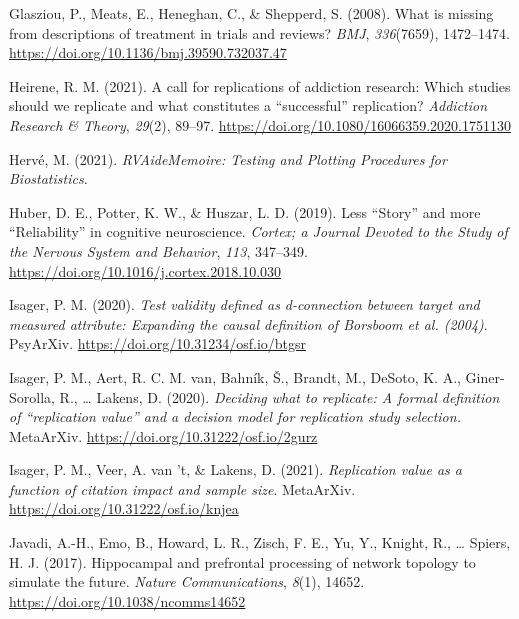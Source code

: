 \documentclass[
  man,floatsintext]{apa6}
\newlength{\cslhangindent}
\newlength{\cslentryspacingunit} %
\newenvironment{CSLReferences}[2] %
 {%
  \setlength{\parindent}{0pt}
  \ifodd #1
  \let\oldpar\par
  \def\par{\hangindent=\cslhangindent\oldpar}
  \fi
  \setlength{\parskip}{#2\cslentryspacingunit}
 }%
 {}
\begin{document}
\begin{CSLReferences}{1}{0}
\leavevmode{}%
Glasziou, P., Meats, E., Heneghan, C., \& Shepperd, S. (2008). What is missing from descriptions of treatment in trials and reviews? \emph{BMJ}, \emph{336}(7659), 1472--1474. \url{https://doi.org/10.1136/bmj.39590.732037.47}

\leavevmode{}%
Heirene, R. M. (2021). A call for replications of addiction research: Which studies should we replicate and what constitutes a {``successful''} replication? \emph{Addiction Research \& Theory}, \emph{29}(2), 89--97. \url{https://doi.org/10.1080/16066359.2020.1751130}

\leavevmode{}%
Hervé, M. (2021). \emph{{RVAideMemoire}: {Testing} and {Plotting Procedures} for {Biostatistics}}.

\leavevmode{}%
Huber, D. E., Potter, K. W., \& Huszar, L. D. (2019). Less {``{Story}''} and more {``{Reliability}''} in cognitive neuroscience. \emph{Cortex; a Journal Devoted to the Study of the Nervous System and Behavior}, \emph{113}, 347--349. \url{https://doi.org/10.1016/j.cortex.2018.10.030}

\leavevmode{}%
Isager, P. M. (2020). \emph{Test validity defined as d-connection between target and measured attribute: {Expanding} the causal definition of {Borsboom} et al. (2004)}. {PsyArXiv}. \url{https://doi.org/10.31234/osf.io/btgsr}

\leavevmode{}%
Isager, P. M., Aert, R. C. M. van, Bahník, Š., Brandt, M., DeSoto, K. A., Giner-Sorolla, R., \ldots{} Lakens, D. (2020). \emph{Deciding what to replicate: {A} formal definition of {``replication value''} and a decision model for replication study selection.} {MetaArXiv}. \url{https://doi.org/10.31222/osf.io/2gurz}

\leavevmode{}%
Isager, P. M., Veer, A. van 't, \& Lakens, D. (2021). \emph{Replication value as a function of citation impact and sample size}. {MetaArXiv}. \url{https://doi.org/10.31222/osf.io/knjea}

\leavevmode{}%
Javadi, A.-H., Emo, B., Howard, L. R., Zisch, F. E., Yu, Y., Knight, R., \ldots{} Spiers, H. J. (2017). Hippocampal and prefrontal processing of network topology to simulate the future. \emph{Nature Communications}, \emph{8}(1), 14652. \url{https://doi.org/10.1038/ncomms14652}


\end{CSLReferences}
\end{document}
